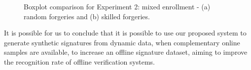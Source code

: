 \begin{figure}[!htb]
\centering
\hspace*{0.8in} %
\caption{Boxplot comparison for Experiment 2: mixed enrollment - (a) random forgeries and (b) skilled forgeries. } \label{fig:boxexp2}
\end{figure}

It is possible for us to conclude that it is possible to use our proposed system to generate synthetic signatures from dynamic data, when complementary online samples are available, to increase an offline signature dataset, aiming to improve the recognition rate of offline verification systems.




